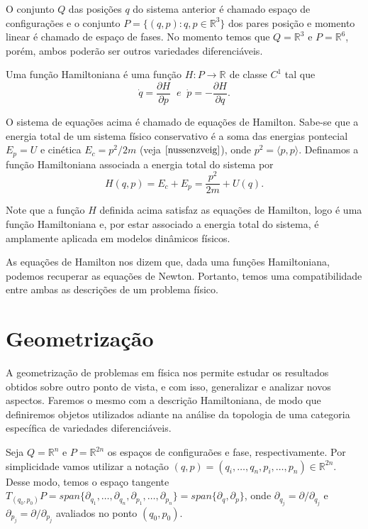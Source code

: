 \documentclass[12pt]{book}
\newcommand{\derivadaparcial}[2]{\frac{\partial #1}{\partial #2}}
\newcommand{\produtointerno}[2]{\langle #1, #2 \rangle}
\newcommand{\real}[1]{\mathbb{R}^{#1}}
\newcommand{\reta}{\real{}}
\begin{document}
	O conjunto $Q$ das posições $q$ do sistema anterior é chamado espaço de configurações e o conjunto $P=\{(q,p): q,p\in \real{3}\}$ dos pares posição e momento linear é chamado de espaço de fases. No momento temos que $Q=\real{3}$ e $P = \real{6}$, porém, ambos poderão ser outros variedades diferenciáveis.
	
	Uma função Hamiltoniana é uma função $H:P \to \reta$ de classe $C^{1}$ tal que 
	$$
	\dot{q} = \derivadaparcial{H}{p} \;\; e \;\; \dot{p} = -\derivadaparcial{H}{q}.
	$$
	
	O sistema de equações acima é chamado de equações de Hamilton. Sabe-se que a energia total de um sistema físico conservativo é a soma das energias pontecial $E_{p} = U$ e cinética $E_{c} = p^{2}/2m$ (veja $\cite{nussenzveig}$), onde $p^{2} = \produtointerno{p}{p}$. Definamos a função Hamiltoniana associada a energia total do sistema por
	$$
	H(q,p) = E_{c} +E_{p} = \frac{p^{2}}{2m}+U(q). 
	$$
	
	Note que a função $H$ definida acima satisfaz as equações de Hamilton, logo é uma função Hamiltoniana e, por estar associado a energia total do sistema, é amplamente aplicada em modelos dinâmicos físicos.
	
	As equações de Hamilton nos dizem que, dada uma funções Hamiltoniana, podemos recuperar as equações de Newton. Portanto, temos uma compatibilidade entre ambas as descrições de um problema físico.
	
	\section{Geometrização}
	
	A geometrização de problemas em física nos permite estudar os resultados obtidos sobre outro ponto de vista, e com isso, generalizar e analizar novos aspectos. Faremos o mesmo com a descrição Hamiltoniana, de modo que definiremos objetos utilizados adiante na análise da topologia de uma categoria específica de variedades diferenciáveis.
	
	Seja $Q= \real{n}$ e $P=\real{2n}$ os espaços de configuraões e fase, respectivamente. Por simplicidade vamos utilizar a notação $(q, p ) = (q_{i}, \dots ,q_{n}, p_{i}, \dots ,p_{n}) \in \real{2n}$. Desse modo,  temos o espaço tangente $T_{(q_{0},p_{0})} P = span\{\partial_{q_{1}}, \dots, \partial_{q_{n}}, \partial_{p_{1}}, \dots, \partial_{p_{n}}\}=span\{\partial_{q}, \partial_{p}\}$, onde $\partial_{q_{j}} = \partial/\partial_{q_{j}}$ e $\partial_{p_{j}} = \partial/\partial_{p_{j}}$ avaliados no ponto $(q_{0}, p_{0})$. 
	
\end{document}
